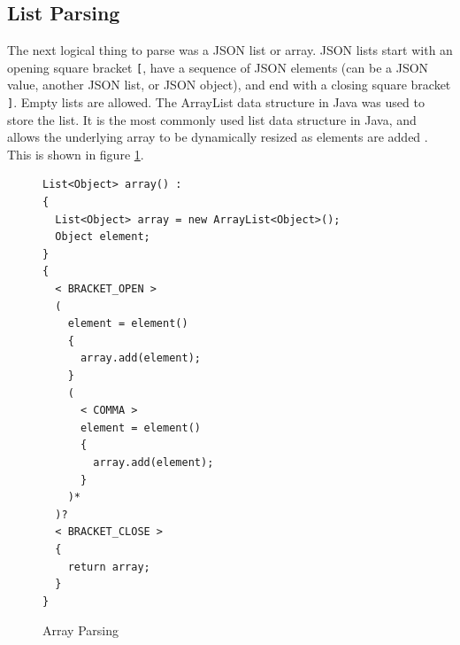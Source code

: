 \subsection{List Parsing}
The next logical thing to parse was a JSON list or array. JSON lists start with an opening square bracket \texttt{[}, have a sequence of JSON elements (can be a JSON value, another JSON list, or JSON object), and end with a closing square bracket \texttt{]}. Empty lists are allowed. The ArrayList data structure in Java was used to store the list. It is the most commonly used list data structure in Java, and allows the underlying array to be dynamically resized as elements are added \cite{array_list}. This is shown in figure \ref{fig:array_parsing}.
\begin{figure}
\centering
\caption{Array Parsing}
\label{fig:array_parsing}
\begin{verbatim}
List<Object> array() :
{
  List<Object> array = new ArrayList<Object>();
  Object element;
}
{
  < BRACKET_OPEN >
  (
    element = element()
    {
      array.add(element);
    }
    (
      < COMMA > 
      element = element()
      {
        array.add(element);
      }
    )*
  )?
  < BRACKET_CLOSE >
  {
    return array;
  }
}
\end{verbatim}
\end{figure}


